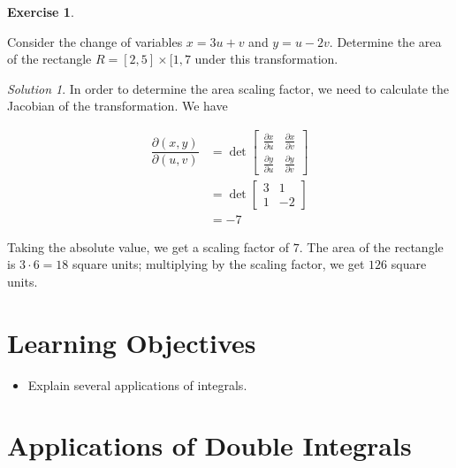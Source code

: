 \documentclass[
]{book}
\providecommand{\tightlist}{%
  \setlength{\itemsep}{0pt}\setlength{\parskip}{0pt}}
\theoremstyle{definition}
\theoremstyle{definition}
\theoremstyle{definition}
\newtheorem{exercise}{Exercise}[chapter]
\theoremstyle{definition}
\theoremstyle{remark}
\newtheorem*{solution}{Solution}
\begin{document}
\begin{exercise}
\protect\hypertarget{exr:unlabeled-div-104}{}\label{exr:unlabeled-div-104}

Consider the change of variables \(x=3u+v\) and \(y=u-2v\). Determine the area of the rectangle \(R=[2,5]\times[1,7\) under this transformation.

\end{exercise}

\begin{solution}

In order to determine the area scaling factor, we need to calculate the Jacobian of the transformation. We have

\begin{align*}
\dfrac{\partial(x,y)}{\partial(u,v)}&=\det\begin{bmatrix}\frac{\partial x}{\partial u} & \frac{\partial x}{\partial v} \\
\frac{\partial y}{\partial u}& \frac{\partial y}{\partial v}\end{bmatrix} \\
&=\det \begin{bmatrix}3& 1\\ 1&-2\end{bmatrix}\\
&= -7
\end{align*}

Taking the absolute value, we get a scaling factor of \(7\). The area of the rectangle is \(3\cdot 6=18\) square units; multiplying by the scaling factor, we get \(126\) square units.

\end{solution}

\hypertarget{learning-objectives-13}{%
\section{Learning Objectives}\label{learning-objectives-13}}

\begin{itemize}
\tightlist
\item
  Explain several applications of integrals.
\end{itemize}

\hypertarget{applications-of-double-integrals}{%
\section{Applications of Double Integrals}\label{applications-of-double-integrals}}
\end{document}
